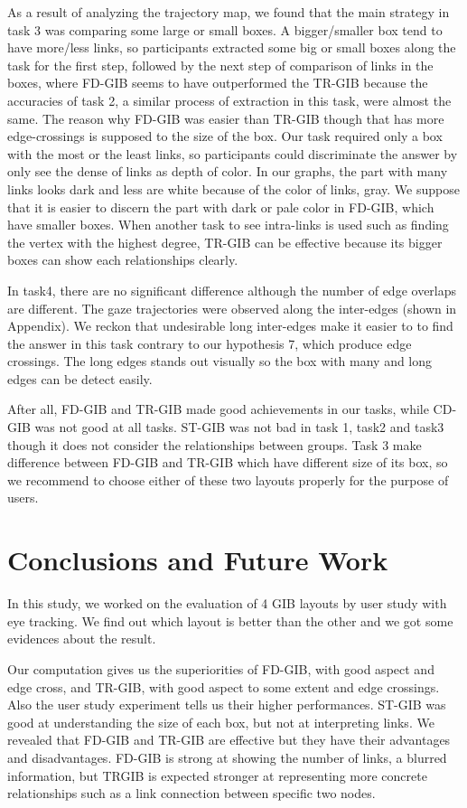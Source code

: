 \documentclass{llncs}
\begin{document}
As a result of analyzing the trajectory map, we found that the main strategy in task 3 was comparing some large or small boxes.
A bigger/smaller box tend to have more/less links, so participants extracted some big or small boxes along the task for the first step, followed by the next step of comparison of links in the boxes, where FD-GIB seems to have outperformed the TR-GIB because the accuracies of task 2, a similar process of extraction in this task, were almost the same.
The reason why FD-GIB was easier than TR-GIB though that has more edge-crossings is supposed to the size of the box.
Our task required only a box with the most or the least links, so participants could discriminate the answer by only see the dense of links as depth of color.
In our graphs, the part with many links looks dark and less are white because of the color of links, gray.
We suppose that it is easier to discern the part with dark or pale color in FD-GIB, which have smaller boxes.
When another task to see intra-links is used such as finding the vertex with the highest degree, TR-GIB can be effective because its bigger boxes can show each relationships clearly.

In task4, there are no significant difference although the number of edge overlaps are different.
The gaze trajectories were observed along the inter-edges (shown in Appendix).
We reckon that undesirable long inter-edges make it easier to to find the answer in this task contrary to our hypothesis 7, which produce edge crossings.
The long edges stands out visually so the box with many and long edges can be detect easily.

After all, FD-GIB and TR-GIB made good achievements in our tasks, while CD-GIB was not good at all tasks.
ST-GIB was not bad in task 1, task2 and task3 though it does not consider the relationships between groups.
Task 3 make difference between FD-GIB and TR-GIB which have different size of its box, so we recommend to choose either of these two layouts properly for the purpose of users.


%
\section{Conclusions and Future Work}
%

In this study, we worked on the evaluation of 4 GIB layouts by user study with eye tracking. We find out which layout is better than the other and we got some evidences about the result.

Our computation gives us the superiorities of FD-GIB, with good aspect and edge cross, and TR-GIB, with good aspect to some extent and edge crossings.
Also the user study experiment tells us their higher performances.
ST-GIB was good at understanding the size of each box, but not at interpreting links.
We revealed that FD-GIB and TR-GIB are effective but they have their advantages and disadvantages.
FD-GIB is strong at showing the number of links, a blurred information, but TRGIB is expected stronger at representing more concrete relationships such as a link connection between specific two nodes.
\end{document}
